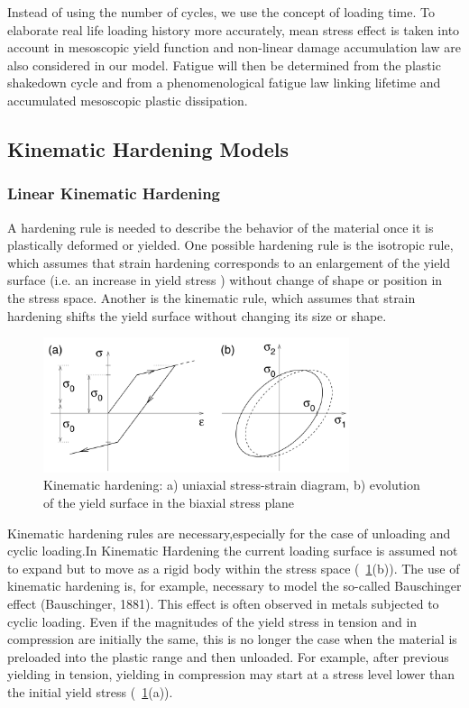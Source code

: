 \documentclass[3p,times,procedia,number]{elsarticle}
\newcommand{\figref}[1]{\figurename~\ref{#1}}
\begin{document}
Instead of using the number of cycles, we use the concept of loading time. To elaborate real life loading history more accurately, mean stress effect is taken into account in mesoscopic yield function and non-linear damage accumulation law are also considered in our model. Fatigue will then be determined from the plastic shakedown cycle and from a phenomenological fatigue law linking lifetime and accumulated mesoscopic plastic dissipation.
\subsection{Kinematic Hardening Models}
\subsubsection{Linear Kinematic Hardening}
A hardening rule is needed to
describe the behavior of the
material once it is plastically
deformed or yielded. One possible hardening rule is the
isotropic rule, which assumes
that strain hardening corresponds
to an enlargement of the yield
surface (i.e. an increase in  yield stress )
without change of shape or
position in the stress space. Another is the kinematic rule,
which assumes that strain
hardening shifts the yield surface
without changing its size or shape.
\begin{figure}[h!]
	\centering
	\includegraphics[width=0.8\textwidth]{figures//kinhard.png} 
	\caption{Kinematic hardening: a) uniaxial stress-strain diagram, b) evolution of the
		yield surface in the biaxial stress plane}
	\label{kinhard}
\end{figure}


Kinematic hardening rules are necessary,especially for the case of unloading and cyclic loading.In Kinematic Hardening the current loading surface is assumed not to expand but to move as a rigid body
within the stress space (\figref{kinhard}(b)). The use
of kinematic hardening is, for example, necessary to model the so-called Bauschinger
effect (Bauschinger, 1881). This effect is often observed in metals subjected to cyclic
loading. Even if the magnitudes of the yield stress in tension and in compression
are initially the same, this is no longer the case when the material is preloaded into
the plastic range and then unloaded. For example, after previous yielding in tension,
yielding in compression may start at a stress level lower than the initial yield stress
(\figref{kinhard}(a)).
\end{document}

